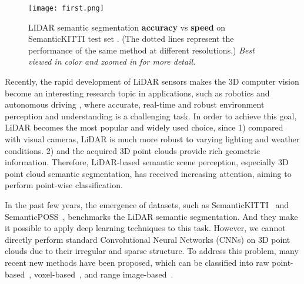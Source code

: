 \documentclass{article}
\begin{document}
\begin{figure}[t]
	\vspace{-4mm}
	\texttt{[image: first.png]}
	\vspace{-4mm}
	\caption{LIDAR semantic segmentation \textbf{accuracy} vs \textbf{speed} on SemanticKITTI test set \cite{behley2019semantickitti}. (The dotted lines represent the performance of the same method at different resolutions.) \textit{Best viewed in color and zoomed in for more detail.}}
	\label{fig:first}
	\vspace{-6mm}
\end{figure}

Recently, the rapid development of LiDAR sensors makes the 3D computer vision become an interesting research topic in applications, such as robotics and autonomous driving \cite{feng2020deep}, where accurate, real-time and robust environment perception and understanding is a challenging task. In order to achieve this goal, LiDAR becomes the most popular and widely used choice, since 1) compared with visual cameras, LiDAR is much more robust to varying lighting and weather conditions. 2) and the acquired 3D point clouds provide rich geometric information. Therefore, LiDAR-based semantic scene perception, especially 3D point cloud semantic segmentation, has received increasing attention, aiming to perform point-wise classification.   


In the past few years, the emergence of datasets, such as SemanticKITTI~\cite{behley2019semantickitti} and SemanticPOSS~\cite{pan2020semanticposs}, benchmarks the LiDAR semantic segmentation. And they make it possible to apply deep learning techniques to this task. However, we cannot directly perform standard Convolutional Neural Networks (CNNs) on 3D point clouds due to their irregular and sparse structure. To address this problem, many recent new methods have been proposed, which can be classified into raw point-based~\cite{qi2017pointnet++, thomas2019kpconv, hu2020randla}, voxel-based~\cite{tang2020searching, zhou2020cylinder3d}, and range image-based~\cite{wu2018squeezeseg,milioto2019rangenet++}.     
\end{document}
